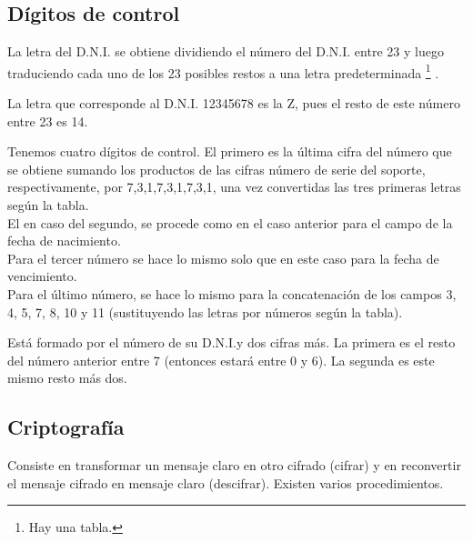 \subsection{Dígitos de control}

\begin{fdefinition}
\normalfont La letra del D.N.I. se obtiene dividiendo el número del D.N.I. entre 23 y luego traduciendo cada uno de los 23 posibles restos a una letra predeterminada \footnote{Hay una tabla.} .
\end{fdefinition}

 \begin{eg}
\normalfont La letra que corresponde al D.N.I. 12345678 es la Z, pues el resto de este número entre 23 es 14. 
\end{eg}

\begin{fdefinition}
\normalfont Tenemos cuatro dígitos de control. El primero es la última cifra del número que se obtiene sumando los productos de las cifras número de serie del soporte, respectivamente, por 7,3,1,7,3,1,7,3,1, una vez convertidas las tres primeras letras según la tabla. \\
El en caso del segundo, se procede como en el caso anterior para el campo de la fecha de nacimiento. \\
Para el tercer número se hace lo mismo solo que en este caso para la fecha de vencimiento. \\
Para el último número, se hace lo mismo para la concatenación de los campos 3, 4, 5, 7, 8, 10 y 11 (sustituyendo las letras por números según la tabla).
\end{fdefinition}

\begin{fdefinition}
\normalfont Está formado por el número de su D.N.I.y dos cifras más. La primera es el resto del número anterior entre 7 (entonces estará entre 0 y 6). La segunda es este mismo resto más dos.
\end{fdefinition}

\subsection{Criptografía}

Consiste en transformar un mensaje claro en otro cifrado (cifrar) y en reconvertir el mensaje cifrado en mensaje claro (descifrar). Existen varios procedimientos. 

